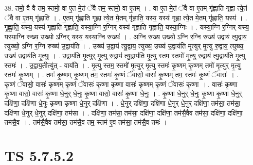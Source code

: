 \documentclass[17pt]{extarticle}
\begin{document}
38. तमो॒ वै वै तम॒ स्तमो॒ वा ए॒त मे॒तं ॅवै तम॒ स्तमो॒ वा ए॒तम् । . वा ए॒त मे॒तं ॅवै वा ए॒तम् गृ॑ह्णाति गृह्णा त्ये॒तं ॅवै वा ए॒तम् गृ॑ह्णाति । . ए॒तम् गृ॑ह्णाति गृह्णा त्ये॒त मे॒तम् गृ॑ह्णाति॒ यस्य॒ यस्य॑ गृह्णा त्ये॒त मे॒तम् गृ॑ह्णाति॒ यस्य॑ । . गृ॒ह्णा॒ति॒ यस्य॒ यस्य॑ गृह्णाति गृह्णाति॒ यस्या॒ग्नि र॒ग्निर् यस्य॑ गृह्णाति गृह्णाति॒ यस्या॒ग्निः । . यस्या॒ग्नि र॒ग्निर् यस्य॒ यस्या॒ग्नि रुख्य॒ उख्यो॒ ऽग्निर् यस्य॒ यस्या॒ग्नि रुख्यः॑ । . अ॒ग्नि रुख्य॒ उख्यो॒ ऽग्नि र॒ग्नि रुख्य॑ उ॒द्वाय॑ त्यु॒द्वाय॒ त्युख्यो॒ ऽग्नि र॒ग्नि रुख्य॑ उ॒द्वाय॑ति । . उख्य॑ उ॒द्वाय॑ त्यु॒द्वाय॒ त्युख्य॒ उख्य॑ उ॒द्वाय॑ति मृ॒त्युर् मृ॒त्यु रु॒द्वाय॒ त्युख्य॒ उख्य॑ उ॒द्वाय॑ति मृ॒त्युः । . उ॒द्वाय॑ति मृ॒त्युर् मृ॒त्यु रु॒द्वाय॑ त्यु॒द्वाय॑ति मृ॒त्यु स्तम॒ स्तमो॑ मृ॒त्यु रु॒द्वाय॑ त्यु॒द्वाय॑ति मृ॒त्यु स्तमः॑ । . उ॒द्वाय॒तीत्यु॑त् - वाय॑ति । . मृ॒त्यु स्तम॒ स्तमो॑ मृ॒त्युर् मृ॒त्यु स्तमः॑ कृ॒ष्णम् कृ॒ष्णम् तमो॑ मृ॒त्युर् मृ॒त्यु स्तमः॑ कृ॒ष्णम् । . तमः॑ कृ॒ष्णम् कृ॒ष्णम् तम॒ स्तमः॑ कृ॒ष्णं ॅवासो॒ वासः॑ कृ॒ष्णम् तम॒ स्तमः॑ कृ॒ष्णं ॅवासः॑ । . कृ॒ष्णं ॅवासो॒ वासः॑ कृ॒ष्णम् कृ॒ष्णं ॅवासः॑ कृ॒ष्णा कृ॒ष्णा वासः॑ कृ॒ष्णम् कृ॒ष्णं ॅवासः॑ कृ॒ष्णा । . वासः॑ कृ॒ष्णा कृ॒ष्णा वासो॒ वासः॑ कृ॒ष्णा धे॒नुर् धे॒नुः कृ॒ष्णा वासो॒ वासः॑ कृ॒ष्णा धे॒नुः । . कृ॒ष्णा धे॒नुर् धे॒नुः कृ॒ष्णा कृ॒ष्णा धे॒नुर् दक्षि॑णा॒ दक्षि॑णा धे॒नुः कृ॒ष्णा कृ॒ष्णा धे॒नुर् दक्षि॑णा । . धे॒नुर् दक्षि॑णा॒ दक्षि॑णा धे॒नुर् धे॒नुर् दक्षि॑णा॒ तम॑सा॒ तम॑सा॒ दक्षि॑णा धे॒नुर् धे॒नुर् दक्षि॑णा॒ तम॑सा । . दक्षि॑णा॒ तम॑सा॒ तम॑सा॒ दक्षि॑णा॒ दक्षि॑णा॒ तम॑सै॒वैव तम॑सा॒ दक्षि॑णा॒ दक्षि॑णा॒ तम॑सै॒व । . तम॑सै॒वैव तम॑सा॒ तम॑सै॒व तम॒ स्तम॑ ए॒व तम॑सा॒ तम॑सै॒व तमः॑ । \newline
\pagebreak
{}

\section{ TS 5.7.5.2 }
\end{document}
